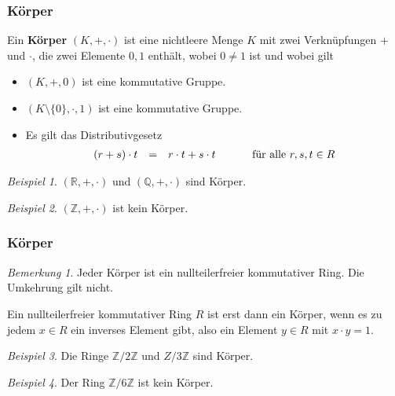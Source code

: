 \documentclass[hyperref={pdfpagelabels=false}]{beamer}
\theoremstyle{plain}%
\theoremstyle{definition}
\theoremstyle{remark}
\newtheorem*{beispiel}{Beispiel}
\newtheorem*{notiz}{Bemerkung}
\def \R{\mathbb R}
\def \Q{\mathbb Q}
\def \Z{\mathbb Z}
\begin{document}
\begin{frame}
\frametitle{Körper}

\begin{definition}  Ein \textbf{Körper} $(K, + , \cdot)$ ist eine nichtleere Menge $K$ mit 
zwei Verknüpfungen $+$ und $\cdot$, die zwei Elemente $0, 1$ enthält, wobei $0 \neq 1$ ist und wobei gilt

\begin{itemize}
  	\item<2-> $(K, +, 0)$ ist eine kommutative Gruppe.
  	\item<3-> $(K \setminus \{0\}, \cdot, 1)$ ist eine kommutative Gruppe.
  	\item<4-> Es gilt das Distributivgesetz
  		$$ \begin{array} {l c l c l}
    		(r + s) \cdot t & = & r \cdot t + s \cdot t & \quad & \textrm{ für alle } r, s, t \in R 
  		\end{array} $$
\end{itemize}
\vspace{-0.7cm}
\end{definition}

\pause  \pause \pause \pause

\begin{beispiel}
$(\R,+,\cdot)$ und $(\Q,+, \cdot)$ sind Körper.
\end{beispiel}

\pause
\begin{beispiel} 
$(\Z,+,\cdot) $ ist kein Körper.
\end{beispiel}

\end{frame}

\begin{frame}
\frametitle{Körper}

\begin{notiz} Jeder Körper ist ein nullteilerfreier kommutativer Ring. Die Umkehrung gilt nicht.

\pause 

Ein nullteilerfreier kommutativer Ring $R$ ist erst dann ein Körper, wenn es zu jedem $x \in R$ ein inverses 
Element gibt, also ein Element $y \in R$ mit $x \cdot y = 1$.
\end{notiz}

\pause 

\begin{beispiel}
Die Ringe $\Z/2 \Z$ und $Z/3\Z$ sind Körper. 
\end{beispiel}

\pause 

\begin{beispiel}
Der Ring $\Z/6 \Z$ ist kein Körper. 
\end{beispiel}

\end{frame}
\end{document}
